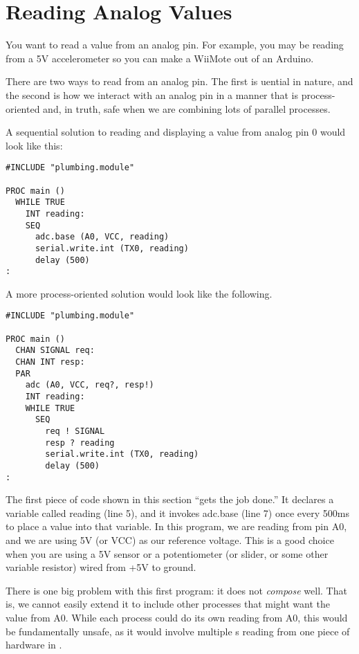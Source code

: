 \section{Reading Analog Values}
\problem
You want to read a value from an analog pin. For example, you may be reading from a 5V accelerometer so you can make a WiiMote out of an Arduino.

\solution
There are two ways to read from an analog pin. The first is {\SEQ}uential in nature, and the second is how we interact with an analog pin in a manner that is process-oriented and, in truth, safe when we are combining lots of parallel processes.

A sequential solution to reading and displaying a value from analog pin 0 would look like this:

\begin{lstlisting}
#INCLUDE "plumbing.module"

PROC main ()
  WHILE TRUE
    INT reading:
    SEQ
      adc.base (A0, VCC, reading)
      serial.write.int (TX0, reading)
      delay (500)
:
\end{lstlisting}

A more process-oriented solution would look like the following.

\begin{lstlisting}
#INCLUDE "plumbing.module"

PROC main ()
  CHAN SIGNAL req:
  CHAN INT resp:
  PAR
    adc (A0, VCC, req?, resp!)
    INT reading:
    WHILE TRUE
      SEQ
        req ! SIGNAL
        resp ? reading
        serial.write.int (TX0, reading)
        delay (500)
:
\end{lstlisting}

\discussion
The first piece of code shown in this section ``gets the job done.'' It declares a variable called {\code reading} (line 5), and it invokes {\code adc.base} (line 7) once every 500ms to place a value into that variable. In this program, we are reading from pin {\constant A0}, and we are using 5V (or {\constant VCC}) as our reference voltage. This is a good choice when you are using a 5V sensor or a potentiometer (or slider, or some other variable resistor) wired from +5V to ground.

There is one big problem with this first program: it does not {\em compose} well. That is, we cannot easily extend it to include other processes that might want the value from {\constant A0}. While each process could do its own reading from {\constant A0}, this would be fundamentally unsafe, as it would involve multiple {\PROC}s reading from one piece of hardware in \PARallel. 

